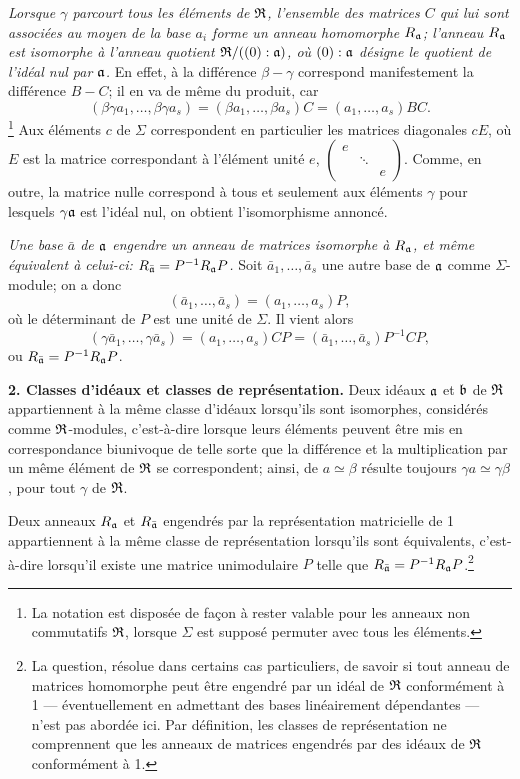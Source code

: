 \emph{Lorsque $\gamma$ parcourt tous les éléments de $\mathfrak R$, l'ensemble des matrices $C$ qui lui sont associées au moyen de la base $a_i$ forme un anneau homomorphe $R_\mathfrak a$; l'anneau $R_\mathfrak a$ est isomorphe à l'anneau quotient $\mathfrak R/((0):\mathfrak a)$, où $(0):\mathfrak a$ désigne le quotient de l'idéal nul par $\mathfrak a$.} En effet, à la différence $\beta-\gamma$ correspond manifestement la différence $B-C$; il en va de même du produit, car
\[
(\beta\gamma a_1,\ldots,\beta\gamma a_s)
=(\beta a_1,\ldots,\beta a_s)C
=(a_1,\ldots,a_s)BC.
\]\footnote{La notation est disposée de façon à rester valable pour les anneaux non commutatifs $\mathfrak R$, lorsque $\Sigma$ est supposé permuter avec tous les éléments.}
Aux éléments $c$ de $\Sigma$ correspondent en particulier les matrices diagonales $cE$, où $E$ est la matrice correspondant à l'élément unité $e$,
$\left(\begin{smallmatrix}e&&\\&\ddots&\\&&e\end{smallmatrix}\right)$.
Comme, en outre, la matrice nulle correspond à tous et seulement aux éléments $\gamma$ pour lesquels $\gamma\mathfrak a$ est l'idéal nul, on obtient l'isomorphisme annoncé.

\emph{Une base $\bar a$ de $\mathfrak a$ engendre un anneau de matrices isomorphe à $R_\mathfrak a$, et même équivalent à celui-ci: $R_{\bar{\mathfrak a}}=P^{-1}R_\mathfrak a P$.} Soit $\bar a_1,\ldots,\bar a_s$ une autre base de $\mathfrak a$ comme $\Sigma$-module; on a donc
\[
(\bar a_1,\ldots,\bar a_s)=(a_1,\ldots,a_s)P,
\]
où le déterminant de $P$ est une unité de $\Sigma$. Il vient alors
\[
(\gamma\bar a_1,\ldots,\gamma\bar a_s)
=(a_1,\ldots,a_s)CP
=(\bar a_1,\ldots,\bar a_s)P^{-1}CP,
\]
ou $R_{\bar{\mathfrak a}}=P^{-1}R_\mathfrak a P$.

\textbf{2. Classes d'idéaux et classes de représentation.} Deux idéaux $\mathfrak a$ et $\mathfrak b$ de $\mathfrak R$ appartiennent à la même classe d'idéaux lorsqu'ils sont isomorphes, considérés comme $\mathfrak R$-modules, c'est-à-dire lorsque leurs éléments peuvent être mis en correspondance biunivoque de telle sorte que la différence et la multiplication par un même élément de $\mathfrak R$ se correspondent; ainsi, de $a\simeq\beta$ résulte toujours $\gamma a\simeq\gamma\beta$, pour tout $\gamma$ de $\mathfrak R$.

Deux anneaux $R_\mathfrak a$ et $R_{\bar{\mathfrak a}}$ engendrés par la représentation matricielle de 1 appartiennent à la même classe de représentation lorsqu'ils sont équivalents, c'est-à-dire lorsqu'il existe une matrice unimodulaire $P$ telle que $R_{\bar{\mathfrak a}}=P^{-1}R_\mathfrak a P$.\footnote{La question, résolue dans certains cas particuliers, de savoir si tout anneau de matrices homomorphe peut être engendré par un idéal de $\mathfrak R$ conformément à 1 --- éventuellement en admettant des bases linéairement dépendantes --- n'est pas abordée ici. Par définition, les classes de représentation ne comprennent que les anneaux de matrices engendrés par des idéaux de $\mathfrak R$ conformément à 1.}

